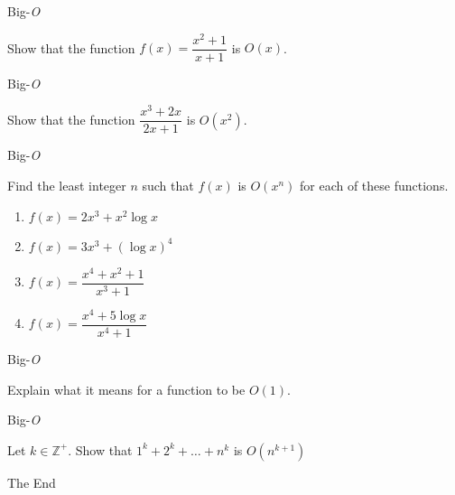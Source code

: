 \documentclass{beamer}
\begin{document}
\begin{frame}[t]{Big-\textit{O}}
    \begin{example}
        Show that the function $f(x) = \dfrac{x^2 + 1}{x + 1}$ is $O(x)$.
    \end{example}
\end{frame}

\begin{frame}[t]{Big-\textit{O}}
    \begin{example}
        Show that the function $\dfrac{x^3 + 2x}{2x + 1}$ is $O(x^2)$.
    \end{example}
\end{frame}

\begin{frame}[t]{Big-\textit{O}}
    \begin{example}
        Find the least integer $n$ such that $f(x)$ is $O(x^n)$ for each of these functions. 
        \begin{enumerate}
            \item $f(x) = 2x^3 + x^2\log{x}$
            \item $f(x) = 3x^3 + (\log{x})^4$
            \item $f(x) = \dfrac{x^4 + x^2 + 1}{x^3 + 1}$
            \item $f(x) = \dfrac{x^4 + 5\log{x}}{x^4 + 1}$
        \end{enumerate}
    \end{example}
\end{frame}

\begin{frame}[t]{Big-\textit{O}}
    \begin{example}
        Explain what it means for a function to be $O(1)$.
    \end{example}
\end{frame}

\begin{frame}[t]{Big-\textit{O}}
   \begin{example}
        Let $k \in \mathbb{Z^+}$. Show that $1^k + 2^k + \dots + n^k$ is $O(n^{k+1})$
   \end{example}
\end{frame}

\begin{frame}{}
    \begin{center}
        The End
    \end{center}
\end{frame}
\end{document}

